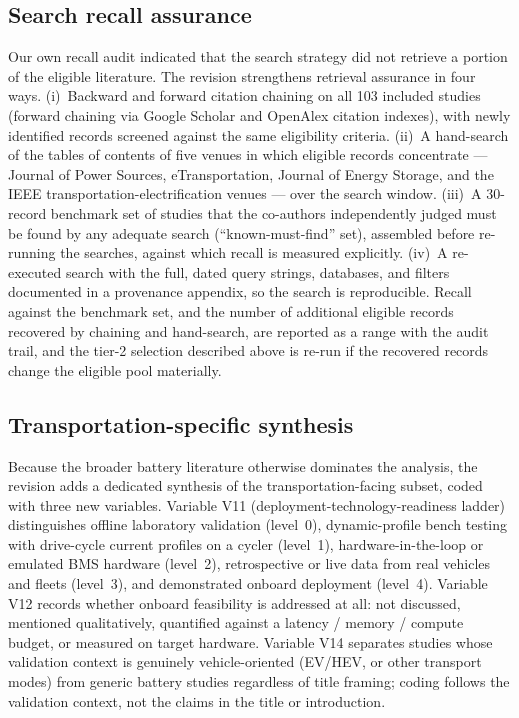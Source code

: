 \subsection{Search recall assurance}

Our own recall audit indicated that the search strategy did not
retrieve a portion of the eligible literature. The revision
strengthens retrieval assurance in four ways. (i)~Backward and forward
citation chaining on all 103 included studies (forward chaining via
Google Scholar and OpenAlex citation indexes), with newly identified
records screened against the same eligibility criteria. (ii)~A
hand-search of the tables of contents of five venues in which eligible
records concentrate --- Journal of Power Sources, eTransportation,
Journal of Energy Storage, and the IEEE transportation-electrification
venues --- over the search window. (iii)~A 30-record benchmark set of
studies that the co-authors independently judged must be found by any
adequate search (``known-must-find'' set), assembled before re-running
the searches, against which recall is measured explicitly. (iv)~A
re-executed search with the full, dated query strings, databases, and
filters documented in a provenance appendix, so the search is
reproducible. Recall against the benchmark set, and the number of
additional eligible records recovered by chaining and hand-search, are
reported as a range with the audit trail, and the tier-2 selection
described above is re-run if the recovered records change the eligible
pool materially.

\subsection{Transportation-specific synthesis}

Because the broader battery literature otherwise dominates the
analysis, the revision adds a dedicated synthesis of the
transportation-facing subset, coded with three new variables. Variable
V11 (deployment-technology-readiness ladder) distinguishes offline
laboratory validation (level~0), dynamic-profile bench testing with
drive-cycle current profiles on a cycler (level~1), hardware-in-the-loop
or emulated BMS hardware (level~2), retrospective or live data from
real vehicles and fleets (level~3), and demonstrated onboard deployment
(level~4). Variable V12 records whether onboard feasibility is
addressed at all: not discussed, mentioned qualitatively, quantified
against a latency / memory / compute budget, or measured on target
hardware. Variable V14 separates studies whose validation context is
genuinely vehicle-oriented (EV/HEV, or other transport modes) from
generic battery studies regardless of title framing; coding follows the
validation context, not the claims in the title or introduction.

